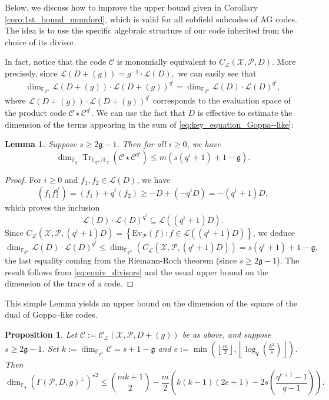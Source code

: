 \documentclass[a4paper]{article}
\newtheorem{proposition}[thm]{Proposition}
\newtheorem{lemma}[thm]{Lemma}
\theoremstyle{definition}
\theoremstyle{remark}
\newcommand{\calP}{\mathcal{P}}
\newcommand{\calL}{\mathcal{L}}
\newcommand{\calC}{\mathcal{C}}
\newcommand{\calX}{\mathcal{X}}
\newcommand{\fqm}{\mathbb{F}_{q^m}}
\newcommand{\fq}{\mathbb{F}_{q}}
\newcommand{\Tr}[1]{\operatorname{Tr}_{\mathbb{F}_{q^m}/\fq}\left(#1\right)}
\newcommand{\set}[1]{\left\{#1\right\}}
\begin{document}
Below, we discuss how to improve the upper bound given in Corollary \ref{coro:1st_bound_mumford}, which is valid for all subfield subcodes of AG codes. The idea is to use the specific algebraic structure of our code inherited from the choice of its divisor.

\noindent In fact, notice that the code $\calC$ is monomially equivalent to $C_{\calL}(\calX,\calP,D)$. 
More precisely, since $\calL(D+(g)) = g^{-1} \cdot \calL(D),$
we can easily see that
\begin{equation} \label{eq:equiv_divisors}
\dim_{\fqm} \calL(D+(g))\cdot \calL(D+(g))^{q^i} = \dim_{\fqm} \calL(D)\cdot \calL(D)^{q^i},
\end{equation}
where $\calL(D+(g))\cdot \calL(D+(g))^{q^i}$ corresponds to the evaluation space of the product code $\calC \star \calC^{q^i}$. We can use the fact that $D$ is effective to estimate the dimension of the terms appearing in the sum of \eqref{eq:key_equation_Goppa--like}:


\begin{lemma} \label{lem:bound_dim_Tr(C*C^q^i)}
  Suppose $s \geq 2\mathfrak{g}-1$. Then for all $i \geq 0$, we have 
   $$\dim_{\fq} \Tr{\calC\star \calC^{q^i}} \leq m\left(s\left(q^i+1\right)+1-\mathfrak{g}\right).$$
\end{lemma}

\begin{proof}
For $i \geq 0$ and $f_1,f_2 \in \calL(D)$, we have 
$$(f_1f_2^{q^i}) = (f_1)+q^i(f_2) \geq -D +(-q^iD) = -(q^i+1)D,$$
which proves the inclusion
$$ \calL(D)\cdot \calL(D)^{q^i} \subseteq \calL((q^i+1)D).$$
Since $C_{\calL}(\calX,\calP,(q^i+1)D) = \set{\mathrm{Ev}_{\calP}(f) : f \in \calL((q^i+1)D)}$, we deduce 
$$ \dim_{\fqm} \calL(D) \cdot \calL(D)^{q^i} \leq \dim_{\fqm}\left(C_{\calL}(\calX,\calP,(q^i+1)D)\right) = s(q^i+1)+1-\mathfrak{g},$$
the last equality coming from the Riemann-Roch theorem (since $s \geq 2\mathfrak{g}-1$). The result follows from \eqref{eq:equiv_divisors} and the usual upper bound on the dimension of the trace of a code. 
\end{proof}

\noindent This simple Lemma yields an upper bound on the dimension of the square of the dual of Goppa--like codes.

\begin{proposition} \label{prop:bound_dim_using_inclusions}
    Let $\calC := \calC_{\calL}(\calX,\calP,D+(g))$ be as above, and suppose $s \geq 2\mathfrak{g}-1$. Set $k := \dim_{\fqm}\calC = s+1-\mathfrak{g}$ and  $e := \min\left(\left\lfloor \frac{m}{2} \right\rfloor,\left\lfloor \log_q\left(\frac{k^2}{s}\right)\right\rfloor\right)$. Then
    $$\dim_{\fq} (\Gamma(\calP,D,g)^{\perp})^{\star 2} \leq \binom{mk+1}{2} - \dfrac{m}{2}\left(k(k-1)(2e+1)-2s\left(\dfrac{q^{e+1}-1}{q-1}\right)\right).$$
\end{proposition}
\end{document}
